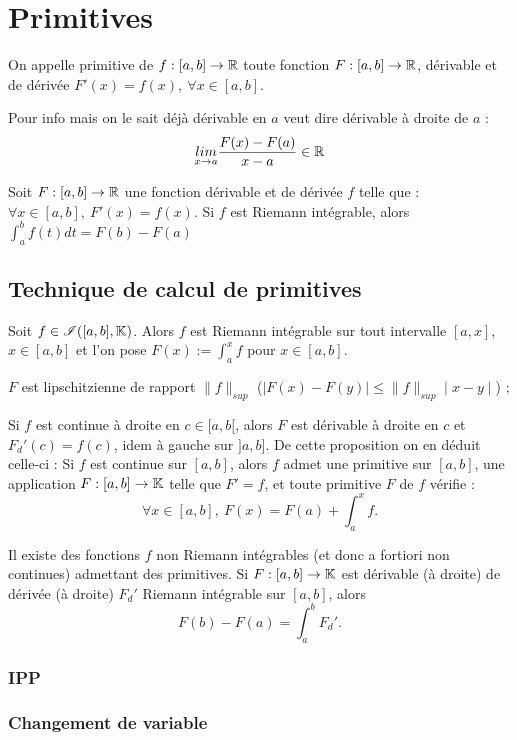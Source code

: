 \newpage

\section{Primitives}
\bd[Primitive]
On appelle primitive de $f : [a,b] \to \mathbb{R}$ toute fonction $F : [a,b] \to \mathbb{R}$, dérivable et de dérivée $F'(x) = f(x), ~ \forall x \in [a,b]$.
\ed

\bn
Pour info mais on le sait déjà dérivable en $a$ veut dire dérivable à droite de $a$ \ie : $$\underset{x\to a}{lim} \frac{F(x)-F(a)}{x-a} \in \mathbb{R}$$
\en

Soit $F : [a,b] \to \mathbb{R}$ une fonction dérivable et de dérivée $f$ telle que : $\forall x \in [a,b], ~ F'(x) = f(x)$. Si $f$ est Riemann intégrable, alors $\int_a^b f(t)dt = F(b) - F(a)$
\ep

\subsection{Technique de calcul de primitives}
\bp
Soit $f \in \mathscr{I}([a,b],\mathbb{K})$. Alors $f$ est Riemann intégrable sur tout intervalle $[a,x]$, $x\in [a,b]$ et l'on pose $F(x) := \int_a^x f$ pour $x\in [a,b]$.
\ben
\item[(a)] $F$ est lipschitzienne de rapport $\|f\|_{sup}$ (\ie $\mid F(x) - F(y) \mid \leq \|f\|_{sup} \mid x - y \mid$) ;
\item[(b)] Si $f$ est continue à droite en $c \in [a,b[$, alors $F$ est dérivable à droite en $c$ et $F_d'(c) = f(c)$, idem à gauche sur $]a,b]$.
\een
\ep
De cette proposition on en déduit celle-ci :
\bp
Si $f$ est continue sur $[a,b]$, alors $f$ admet une primitive sur $[a,b]$, \ie une application $F : [a,b] \to \mathbb{K}$ telle que $F' = f$, et toute primitive $F$ de $f$ vérifie : $$\forall x \in [a,b], ~ F(x) = F(a) + \int_a^x f.$$
\ep

\bw
Il existe des fonctions $f$ non Riemann intégrables (et donc a fortiori non continues) admettant des primitives.
\ew
\bp
Si $F : [a,b] \to \mathbb{K}$ est dérivable (à droite) de dérivée (à droite) $F_d'$ Riemann intégrable sur $[a,b]$, alors $$F(b)-F(a) = \int_a^b F_d'.$$
\ep

\subsubsection{IPP}
\subsubsection{Changement de variable}

